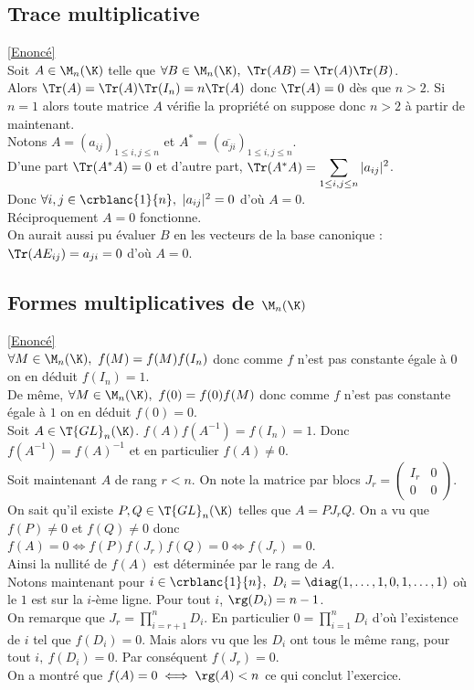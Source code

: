 \documentclass[8pt]{book}
\begin{document}
	\subsection{Trace multiplicative }
	\label{Trace multiplicative corrigé}
	\textcolor{blue}{\hyperref[Trace multiplicative]{[Enoncé]}}\\
	Soit $A\in \M_n(\K)$ telle que $\forall B\in \M_n(\K),\ \Tr(AB)=\Tr(A)\Tr(B)$.\\
	Alors $\Tr(A)=\Tr(A)\Tr(I_n)=n\Tr(A)$ donc $\Tr(A)=0$ dès que $n>2$. Si $n=1$ alors toute matrice $A$ vérifie la propriété on suppose donc $n>2$ à partir de maintenant.\\
	Notons $A=(a_{ij})_{1\leq i,j\leq n}$ et $A^*=(\overline{a_{ji}})_{1\leq i,j\leq n}$.\\
	D'une part $\Tr(A^*A)=0$ et d'autre part, $\Tr(A^*A)=\displaystyle\sum_{1\leq i,j\leq n}|a_{ij}|^2$.\\
	Donc $\forall i,j\in \crblanc{1}{n},\ |a_{ij}|^2=0$ d'où $A=0$.\\
	Réciproquement $A=0$ fonctionne.\\
	On aurait aussi pu évaluer $B$ en les vecteurs de la base canonique : $\Tr(AE_{ij})=a_{ji}=0$ d'où $A=0$.
	
	\subsection{Formes multiplicatives de $\M_n(\K)$ }
	\label{Formes multiplicatives de M_n(K) corrigé}
	\textcolor{blue}{\hyperref[Formes multiplicatives de M_n(K)]{[Enoncé]}}\\
	$\forall M\in \M_n(\K),\ f(M)=f(M)f(I_n)$ donc comme $f$ n'est pas constante égale à $0$ on en déduit $f(I_n)=1$.\\
	De même, $\forall M\in \M_n(\K),\ f(0)=f(0)f(M)$ donc comme $f$ n'est pas constante égale à $1$ on en déduit $f(0)=0$.\\
	Soit $A\in \T{GL}_n(\K)$. $f(A)f(A^{-1})=f(I_n)=1$. Donc $f(A^{-1})=f(A)^{-1}$ et en particulier $f(A)\ne 0$.\\
	Soit maintenant $A$ de rang $r<n$. On note la matrice par blocs $J_r=\begin{pmatrix}
		I_r&0\\
		0&0
	\end{pmatrix}$.\\
	On sait qu'il existe $P,Q\in \T{GL}_n(\K)$ telles que $A=PJ_rQ$. On a vu que $f(P)\ne 0$ et $f(Q)\ne 0$ donc $f(A)=0\iff f(P)f(J_r)f(Q)=0\iff f(J_r)=0$.\\
	Ainsi la nullité de $f(A)$ est déterminée par le rang de $A$.\\
	Notons maintenant pour $i\in \crblanc{1}{n},\ D_i=\diag(1,\dots,1,0,1,\dots,1)$ où le $1$ est sur la $i$-ème ligne. Pour tout $i$, $\rg(D_i)=n-1$.\\
	On remarque que $J_r=\displaystyle\prod_{i=r+1}^nD_i$. En particulier $0=\displaystyle\prod_{i=1}^nD_i$ d'où l'existence de $i$ tel que $f(D_i)=0$. Mais alors vu que les $D_i$ ont tous le même rang, pour tout $i,\ f(D_i)=0$. Par conséquent $f(J_r)=0$.\\
	On a montré que $f(A)=0\iff \rg(A)<n$ ce qui conclut l'exercice.
	
\end{document}

